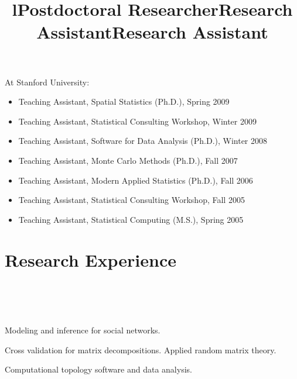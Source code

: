 \documentclass[overlapped,line,letterpaper]{res}
\begin{document}
\begin{resume}
At Stanford University:

\begin{itemize}
\item Teaching Assistant, Spatial Statistics (Ph.D.), Spring 2009
\item Teaching Assistant, Statistical Consulting Workshop, Winter 2009
\item Teaching Assistant, Software for Data Analysis (Ph.D.), Winter 2008
\item Teaching Assistant, Monte Carlo Methods (Ph.D.), Fall 2007
\item Teaching Assistant, Modern Applied Statistics (Ph.D.), Fall 2006
\item Teaching Assistant, Statistical Consulting Workshop, Fall 2005
\item Teaching Assistant, Statistical Computing (M.S.), Spring 2005
\end{itemize}


\section{\bf Research Experience}

\begin{format}
\title{l}\\
\\
\body\\
\end{format}

\title{Postdoctoral Researcher}
\begin{position}
  Modeling and inference for social networks.
\end{position}

\title{Research Assistant}
\begin{position}
  Cross validation for matrix decompositions.  Applied random matrix theory.
\end{position}

\title{Research Assistant}
\begin{position}
  Computational topology software and data analysis.
\end{position}



\end{resume}
\end{document}
